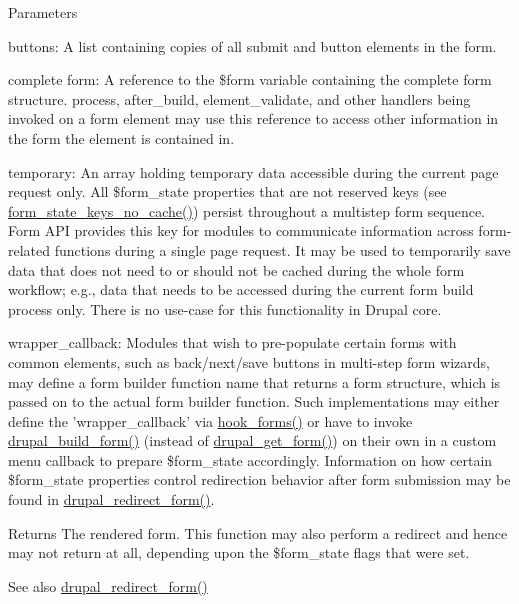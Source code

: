 \begin{DoxyParams}{Parameters}
\begin{DoxyItemize}
\item buttons: A list containing copies of all submit and button elements in the form.
\item complete form: A reference to the \$form variable containing the complete form structure. process, after\_\-build, element\_\-validate, and other handlers being invoked on a form element may use this reference to access other information in the form the element is contained in.
\item temporary: An array holding temporary data accessible during the current page request only. All \$form\_\-state properties that are not reserved keys (see \hyperlink{group__form__api_gabffb5c6a1218bb14db316fe29c4e52af}{form\_\-state\_\-keys\_\-no\_\-cache()}) persist throughout a multistep form sequence. Form API provides this key for modules to communicate information across form-\/related functions during a single page request. It may be used to temporarily save data that does not need to or should not be cached during the whole form workflow; e.g., data that needs to be accessed during the current form build process only. There is no use-\/case for this functionality in Drupal core.
\item wrapper\_\-callback: Modules that wish to pre-\/populate certain forms with common elements, such as back/next/save buttons in multi-\/step form wizards, may define a form builder function name that returns a form structure, which is passed on to the actual form builder function. Such implementations may either define the 'wrapper\_\-callback' via \hyperlink{group__hooks_gaa764fee74b85797f75c0c923cad628d5}{hook\_\-forms()} or have to invoke \hyperlink{group__form__api_gabead4b3c089fd605421d371a0315c4d7}{drupal\_\-build\_\-form()} (instead of \hyperlink{group__form__api_ga720df81a837b06dfe19daf1c1eea3437}{drupal\_\-get\_\-form()}) on their own in a custom menu callback to prepare \$form\_\-state accordingly. Information on how certain \$form\_\-state properties control redirection behavior after form submission may be found in \hyperlink{group__form__api_ga552fc91207f10c473d36bf3f9889506c}{drupal\_\-redirect\_\-form()}.
\end{DoxyItemize}\end{DoxyParams}
\begin{DoxyReturn}{Returns}
The rendered form. This function may also perform a redirect and hence may not return at all, depending upon the \$form\_\-state flags that were set.
\end{DoxyReturn}
\begin{DoxySeeAlso}{See also}
\hyperlink{group__form__api_ga552fc91207f10c473d36bf3f9889506c}{drupal\_\-redirect\_\-form()} 
\end{DoxySeeAlso}
